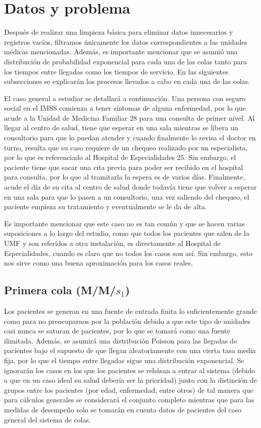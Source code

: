 \documentclass[10pt]{article}
\begin{document}
    \section{Datos y problema}
    Después de realizar una limpieza básica para eliminar datos innecesarios y registros vacíos, filtramos únicamente los datos correspondientes a las unidades médicas mencionadas. Además, es importante mencionar que se asumió una distribución de probabilidad exponencial para cada una de las colas tanto para los tiempos entre llegadas como los tiempos de servicio. En las siguientes subsecciones se explicarán los procesos llevados a cabo en cada una de las colas.
    
    El caso general a estudiar se detallará a continuación. Una persona con seguro social en el IMSS comienza a tener síntomas de alguna enfermedad, por lo que acude a la Unidad de Medicina Familiar 28 para una consulta de primer nivel. Al llegar al centro de salud, tiene que esperar en una sala mientras se libera un consultorio para que lo puedan atender y cuando finalmente lo revisa el doctor en turno, resulta que su caso requiere de un chequeo realizado por un especialista, por lo que es referenciado al Hospital de Especialidades 25. Sin embargo, el paciente tiene que sacar una cita previa para poder ser recibido en el hospital para consulta, por lo que al tramitarla la espera es de varios días. Finalmente, acude el día de su cita al centro de salud donde todavía tiene que volver a esperar en una sala para que lo pasen a un consultorio, una vez saliendo del chequeo, el paciente empieza su tratamiento y eventualmente se le da de alta.
    
    Es importante mencionar que este caso no es tan común y que se hacen varias suposiciones a lo largo del estudio, como que todos los pacientes que salen de la UMF y son referidos a otra instalación, es directamente al Hospital de Especialidades, cuando es claro que no todos los casos son así. Sin embargo, esto nos sirve como una buena aproximación para los casos reales.
    
    \subsection{Primera cola (M/M/$s_{1}$)}
    Los pacientes se generan en una fuente de entrada finita lo suficientemente grande como para no preocuparnos por la población debido a que este tipo de unidades casi nunca se saturan de pacientes, por lo que se tomará como una fuente ilimitada. Además, se asumirá una distribución Poisson para las llegadas de pacientes bajo el supuesto de que llegan aleatoriamente con una cierta tasa media fija, por lo que el tiempo entre llegadas sigue una distribución exponencial. Se ignorarán los casos en los que los pacientes se rehúsan a entrar al sistema (debido a que en un caso ideal su salud debería ser la prioridad) junto con la distinción de grupos entre los pacientes (por edad, enfermedad, entre otros) de tal manera que para cálculos generales se considerará el conjunto completo mientras que para las medidas de desempeño solo se tomarán en cuenta datos de pacientes del caso general del sistema de colas.
    
\end{document}
